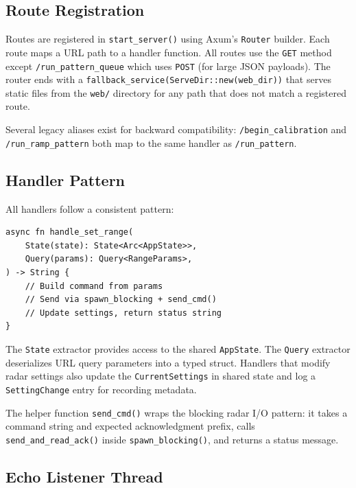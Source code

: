 \documentclass[11pt,letterpaper]{article}
\begin{document}
\subsection{Route Registration}
\label{subsec:route-registration}

Routes are registered in \texttt{start\_server()} using Axum's \texttt{Router} builder. Each route maps a URL path to a handler function. All routes use the \texttt{GET} method except \texttt{/run\_pattern\_queue} which uses \texttt{POST} (for large JSON payloads). The router ends with a \texttt{fallback\_service(ServeDir::new(web\_dir))} that serves static files from the \texttt{web/} directory for any path that does not match a registered route.

Several legacy aliases exist for backward compatibility: \texttt{/begin\_calibration} and \texttt{/run\_ramp\_pattern} both map to the same handler as \texttt{/run\_pattern}.

\subsection{Handler Pattern}
\label{subsec:handler-pattern}

All handlers follow a consistent pattern:

\begin{lstlisting}[basicstyle=\small\ttfamily]
async fn handle_set_range(
    State(state): State<Arc<AppState>>,
    Query(params): Query<RangeParams>,
) -> String {
    // Build command from params
    // Send via spawn_blocking + send_cmd()
    // Update settings, return status string
}
\end{lstlisting}

The \texttt{State} extractor provides access to the shared \texttt{AppState}. The \texttt{Query} extractor deserializes URL query parameters into a typed struct. Handlers that modify radar settings also update the \texttt{CurrentSettings} in shared state and log a \texttt{SettingChange} entry for recording metadata.

The helper function \texttt{send\_cmd()} wraps the blocking radar I/O pattern: it takes a command string and expected acknowledgment prefix, calls \texttt{send\_and\_read\_ack()} inside \texttt{spawn\_blocking()}, and returns a status message.

\subsection{Echo Listener Thread}
\label{subsec:echo-listener}
\end{document}
